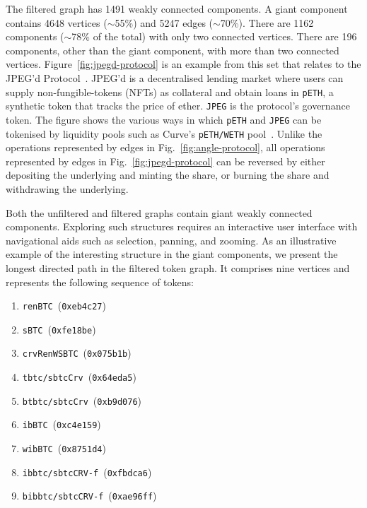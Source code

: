 The filtered graph has \num{1491} weakly connected components.  A
giant component contains \num{4648} vertices ($\sim$\num{55}\%) and
\num{5247} edges ($\sim$\num{70}\%).  There are \num{1162} components
($\sim$\num{78}\% of the total) with only two connected vertices.
There are \num{196} components, other than the giant component, with
more than two connected vertices.  Figure~\ref{fig:jpegd-protocol} is
an example from this set that relates to the JPEG'd
Protocol~\cite{jpegd-xx}.  JPEG'd is a decentralised lending market
where users can supply non-fungible-tokens (NFTs) as collateral and
obtain loans in \texttt{pETH}, a synthetic token that tracks the price
of ether. \texttt{JPEG} is the protocol's governance token.  The
figure shows the various ways in which \texttt{pETH} and \texttt{JPEG}
can be tokenised by liquidity pools such as Curve's \texttt{pETH/WETH}
pool~\cite{curve-finance-xx}. Unlike the operations represented by
edges in Fig.~\ref{fig:angle-protocol}, all operations represented by
edges in Fig.~\ref{fig:jpegd-protocol} can be reversed by either
depositing the underlying and minting the share, or burning the share
and withdrawing the underlying.

Both the unfiltered and filtered graphs contain giant weakly connected
components.  Exploring such structures requires an interactive user
interface with navigational aids such as selection, panning, and
zooming.  As an illustrative example of the interesting structure in
the giant components, we present the longest directed path in the
filtered token graph.  It comprises nine vertices and represents the
following sequence of tokens:

\begin{enumerate}[font=\small]
\item \texttt{renBTC}~(\texttt{0xeb4c27})
\item \texttt{sBTC}~(\texttt{0xfe18be})
\item \texttt{crvRenWSBTC}~(\texttt{0x075b1b})
\item \texttt{tbtc/sbtcCrv}~(\texttt{0x64eda5})
\item \texttt{btbtc/sbtcCrv}~(\texttt{0xb9d076})
\item \texttt{ibBTC}~(\texttt{0xc4e159})
\item \texttt{wibBTC}~(\texttt{0x8751d4})
\item \texttt{ibbtc/sbtcCRV-f}~(\texttt{0xfbdca6})
\item \texttt{bibbtc/sbtcCRV-f}~(\texttt{0xae96ff})
\end{enumerate}

